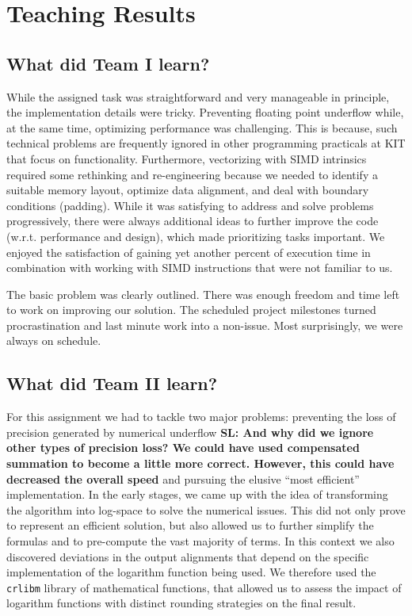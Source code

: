\documentclass[runningheads,a4paper]{llncs}
\begin{document}
\section{Teaching Results}
\label{teaching-results}
\subsection{What did Team I learn?}
While the assigned task was straightforward and very manageable in principle,
the implementation details were tricky.
Preventing floating point underflow while, at the same time, optimizing performance was challenging.
This is because, such technical problems are frequently ignored in other programming practicals at KIT
that focus on functionality.
Furthermore, vectorizing with SIMD intrinsics required some rethinking and re-engineering
because we needed to identify a suitable memory layout, optimize data alignment,
and deal with boundary conditions (padding).
While it was satisfying to address and solve problems progressively,
there were always additional ideas to further improve the code (w.r.t. performance and design),
which made prioritizing tasks important.
We enjoyed the satisfaction of gaining yet another percent of execution time in combination
with working with SIMD instructions that were not familiar to us.

The basic problem was clearly outlined. There was enough freedom and time left
to work on improving our solution. The scheduled project milestones
turned procrastination and last minute work into a non-issue.
Most surprisingly, we were always on schedule.



\subsection{What did Team II learn?}
For this assignment we had to tackle two major problems: preventing the loss of precision generated by numerical underflow {\bf SL: And why did we ignore other types of precision loss? We could have used compensated summation to become a little more correct. However, this could have decreased the overall speed} and
pursuing the elusive ``most efficient'' implementation.
In the early stages, we came up with the idea of transforming the algorithm into log-space to solve the numerical issues.
This did not only prove to represent an efficient solution, but also allowed us to further simplify the formulas and to pre-compute the vast majority of terms.
In this context we also discovered deviations in the output alignments
that depend on the specific implementation of the logarithm function being used.
We therefore used the \texttt{crlibm} library of mathematical functions, that allowed us to assess the impact of logarithm functions with distinct rounding strategies
on the final result.
\end{document}
